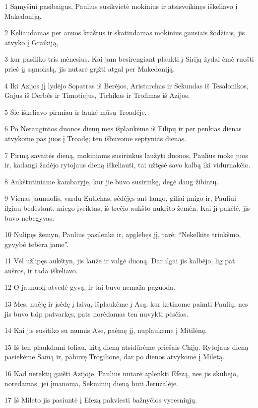 \par 1 Sąmyšiui pasibaigus, Paulius susikvietė mokinius ir atsisveikinęs iškeliavo į Makedoniją. 
\par 2 Keliaudamas per anuos kraštus ir skatindamas mokinius gausiais žodžiais, jis atvyko į Graikiją, 
\par 3 kur pasiliko tris mėnesius. Kai jam besirengiant plaukti į Siriją žydai ėmė ruošti prieš jį sąmokslą, jis nutarė grįžti atgal per Makedoniją. 
\par 4 Iki Azijos jį lydėjo Sopatras iš Berėjos, Aristarchas ir Sekundas iš Tesalonikos, Gajus iš Derbės ir Timotiejus, Tichikas ir Trofimas iš Azijos. 
\par 5 Šie iškeliavo pirmiau ir laukė mūsų Troadėje. 
\par 6 Po Neraugintos duonos dienų mes išplaukėme iš Filipų ir per penkias dienas atvykome pas juos į Troadę; ten išbuvome septynias dienas. 
\par 7 Pirmą savaitės dieną, mokiniams susirinkus laužyti duonos, Paulius mokė juos ir, kadangi žadėjo rytojaus dieną iškeliauti, tai užtęsė savo kalbą iki vidurnakčio. 
\par 8 Aukštutiniame kambaryje, kur jie buvo susirinkę, degė daug žibintų. 
\par 9 Vienas jaunuolis, vardu Eutichas, sėdėjęs ant lango, giliai įmigo ir, Pauliui ilgiau bedėstant, miego įveiktas, iš trečio aukšto nukrito žemėn. Kai jį pakėlė, jis buvo nebegyvas. 
\par 10 Nulipęs žemyn, Paulius pasilenkė ir, apglėbęs jį, tarė: “Nekelkite triukšmo, gyvybė tebėra jame”. 
\par 11 Vėl užlipęs aukštyn, jis laužė ir valgė duoną. Dar ilgai jis kalbėjo, lig pat aušros, ir tada iškeliavo. 
\par 12 O jaunuolį atvedė gyvą, ir tai buvo nemaža paguoda. 
\par 13 Mes, nuėję ir įsėdę į laivą, išplaukėme į Asą, kur ketinome paimti Paulių, nes jis buvo taip patvarkęs, pats norėdamas ten nuvykti pėsčias. 
\par 14 Kai jis susitiko su mumis Ase, paėmę jį, nuplaukėme į Mitilėnę. 
\par 15 Iš ten plaukdami toliau, kitą dieną atsidūrėme priešais Chiją. Rytojaus dieną pasiekėme Samą ir, pabuvę Trogilione, dar po dienos atvykome į Miletą. 
\par 16 Kad netektų gaišti Azijoje, Paulius nutarė aplenkti Efezą, nes jis skubėjo, norėdamas, jei įmanoma, Sekminių dieną būti Jeruzalėje. 
\par 17 Iš Mileto jis pasiuntė į Efezą pakviesti bažnyčios vyresniųjų. 
